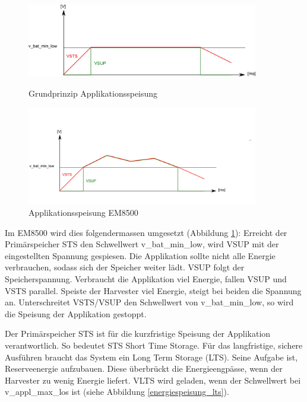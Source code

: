 \begin{figure}[ht]
 \begin{minipage}[t]{0.5\textwidth}
   \includegraphics[width=0.9\textwidth]{2TheoretischeGrundlagen/imag/levelMitSTsTheoriel.png}
   \caption{Grundprinzip Applikationsspeisung }
   \label{em_grundprinzip} 
 \end{minipage}
 \begin{minipage}[t]{0.5\textwidth}
   \includegraphics[width=0.9\textwidth]{2TheoretischeGrundlagen/imag/levelSTSReal.png}
   \caption{Applikationsspeisung EM8500}
   \label{em_grundprinzip_em8500} 
 \end{minipage}
\end{figure}

Im EM8500 wird dies folgendermassen umgesetzt (Abbildung \ref{em_grundprinzip_em8500}): Erreicht der Primär\-speicher STS den Schwellwert v\_bat\_min\_low, wird VSUP mit der eingestellten Spannung gespiesen. Die Applikation sollte nicht alle Energie verbrauchen, sodass sich der Speicher weiter lädt.  VSUP folgt der Speicherspannung. Verbraucht die Applikation viel Energie, fallen VSUP und VSTS parallel. Speiste der Harvester viel Energie, steigt bei beiden die Spannung an. Unterschreitet VSTS/VSUP den Schwellwert von v\_bat\_min\_low, so wird die Speisung der Applikation gestoppt.



Der Primärspeicher STS ist für die kurzfristige Speisung der Applikation verantwortlich. So bedeutet STS Short Time Storage. Für das langfristige, sichere Ausführen braucht das System ein Long Term Storage (LTS). Seine Aufgabe ist, Reserveenergie aufzubauen. Diese überbrückt die Energieengpässe, wenn der Harvester zu wenig Energie liefert.
VLTS wird geladen, wenn der Schwellwert bei v\_appl\_max\_los ist (siehe Abbildung \ref{energiespeisung_lts}).

